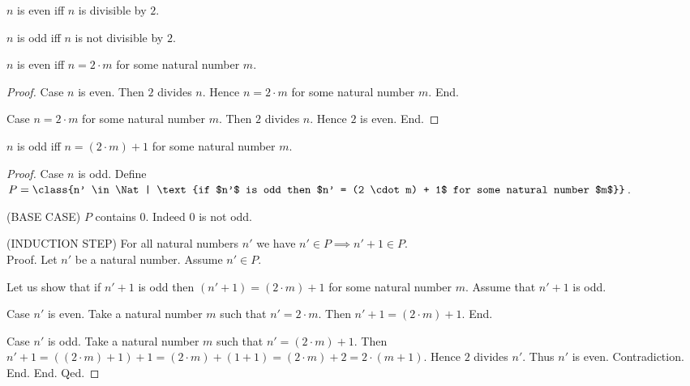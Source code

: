 \documentclass[../../arithmetic.tex]{subfiles}
\begin{document}
  \begin{forthel}
    \begin{definition}
      $n$ is even iff $n$ is divisible by $2$.
    \end{definition}

    \begin{definition}
      $n$ is odd iff $n$ is not divisible by $2$.
    \end{definition}

    \begin{proposition}\label{Arithmetic_03_07_592766}
      $n$ is even iff $n = 2 \cdot m$ for some natural number $m$.
    \end{proposition}
    \begin{proof}
      Case $n$ is even.
        Then $2$ divides $n$.
        Hence $n = 2 \cdot m$ for some natural number $m$.
      End.

      Case $n = 2 \cdot m$ for some natural number $m$.
        Then $2$ divides $n$.
        Hence $2$ is even.
      End.
    \end{proof}

    \begin{proposition}\label{Arithmetic_03_07_275487}
      $n$ is odd iff $n = (2 \cdot m) + 1$ for some natural number $m$.
    \end{proposition}
    \begin{proof}
      Case $n$ is odd.
        Define $P = \class{n' \in \Nat | \text{if $n'$ is odd then $n' = (2 \cdot m) + 1$ for some natural number $m$}}$.

        (BASE CASE) $P$ contains $0$.
        Indeed $0$ is not odd.

        (INDUCTION STEP) For all natural numbers $n'$ we have $n' \in P \implies n' + 1 \in P$. \\
        Proof.
          Let $n'$ be a natural number.
          Assume $n' \in P$.

          Let us show that if $n' + 1$ is odd then $(n' + 1) = (2 \cdot m) + 1$ for some natural number $m$.
            Assume that $n' + 1$ is odd.

            Case $n'$ is even.
              Take a natural number $m$ such that $n' = 2 \cdot m$.
              Then $n' + 1 = (2 \cdot m) + 1$.
            End.

            Case $n'$ is odd.
              Take a natural number $m$ such that $n' = (2 \cdot m) + 1$.
              Then $n' + 1 =
              ((2 \cdot m) + 1) + 1 =
              (2 \cdot m) + (1 + 1) =
              (2 \cdot m) + 2 =
              2 \cdot (m + 1)$.
              Hence $2$ divides $n'$.
              Thus $n'$ is even.
              Contradiction.
            End.
          End.
        Qed.


\end{proof}
\end{forthel}
\end{document}

